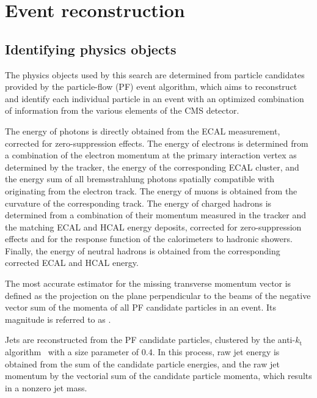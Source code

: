 
\clearpage
\section{Event reconstruction}
\label{sec:reconstruction}

\subsection{Identifying physics objects}

The physics objects used by this search are determined from particle
candidates provided by the particle-flow (PF) event algorithm, which
aims to reconstruct and identify each individual particle in an event
with an optimized combination of information from the various elements
of the CMS detector. 

The energy of photons is directly obtained from
the ECAL measurement, corrected for zero-suppression effects. The
energy of electrons is determined from a combination of the electron
momentum at the primary interaction vertex as determined by the
tracker, the energy of the corresponding ECAL cluster, and the energy
sum of all bremsstrahlung photons spatially compatible with
originating from the electron track. The energy of muons is obtained
from the curvature of the corresponding track. The energy of charged
hadrons is determined from a combination of their momentum measured in
the tracker and the matching ECAL and HCAL energy deposits, corrected
for zero-suppression effects and for the response function of the
calorimeters to hadronic showers. Finally, the energy of neutral
hadrons is obtained from the corresponding corrected ECAL and HCAL
energy.

The most accurate estimator for the missing transverse momentum vector
\ptvecmiss is defined as the projection on the plane perpendicular to
the beams of the negative vector sum of the momenta of all PF
candidate particles in an event. Its magnitude is referred to as
\ETmiss.

Jets are reconstructed from the PF candidate particles, clustered by
the anti-$k_\mathrm{t}$ algorithm~\cite{Cacciari:2008gp,
  Cacciari:2011ma} with a size parameter of 0.4. In this process, raw
jet energy is obtained from the sum of the candidate particle
energies, and the raw jet momentum by the vectorial sum of the
candidate particle momenta, which results in a nonzero jet mass.


